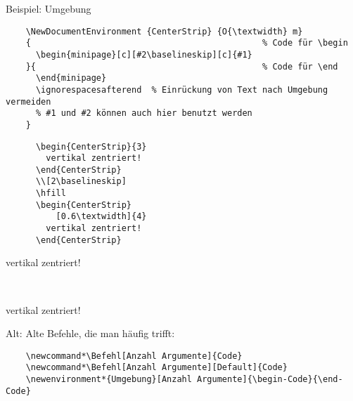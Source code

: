 \begin{frame}[fragile]{Beispiel: Umgebung}
  \begin{verbatim}
    \NewDocumentEnvironment {CenterStrip} {O{\textwidth} m}
    {                                              % Code für \begin
      \begin{minipage}[c][#2\baselineskip][c]{#1}
    }{                                             % Code für \end
      \end{minipage}
      \ignorespacesafterend  % Einrückung von Text nach Umgebung vermeiden
      % #1 und #2 können auch hier benutzt werden
    }
  \end{verbatim}

  \begin{CodeExample}{0.5}
    \begin{verbatim}
      \begin{CenterStrip}{3}
        vertikal zentriert!
      \end{CenterStrip}
      \\[2\baselineskip]
      \hfill
      \begin{CenterStrip}
          [0.6\textwidth]{4}
        vertikal zentriert!
      \end{CenterStrip}
    \end{verbatim}
  \CodeResult
    \begin{CenterStrip}{3}
      \strut
      vertikal zentriert!
    \end{CenterStrip}
    \\[2\baselineskip]
    \hfill
    \begin{CenterStrip}[0.6\textwidth]{4}
      \strut
      vertikal zentriert!
    \end{CenterStrip}
  \end{CodeExample}
\end{frame}

\begin{frame}[fragile]{Alt: }
  Alte Befehle, die man häufig trifft:
  \begin{verbatim}
    \newcommand*\Befehl[Anzahl Argumente]{Code}
    \newcommand*\Befehl[Anzahl Argumente][Default]{Code}
    \newenvironment*{Umgebung}[Anzahl Argumente]{\begin-Code}{\end-Code}
  \end{verbatim}
\end{frame}
